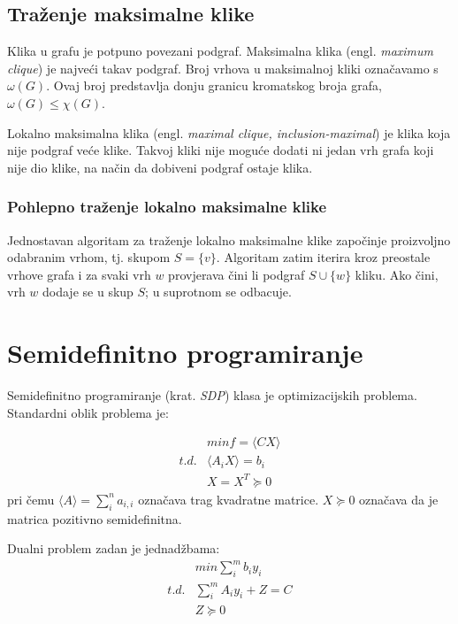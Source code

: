 \documentclass[diplomskirad]{fer}
\begin{document}
\section{Traženje maksimalne klike}
Klika u grafu je potpuno povezani podgraf. Maksimalna klika (engl. \textit{maximum clique}) je najveći takav podgraf. Broj vrhova u maksimalnoj kliki označavamo s $\omega(G)$.
Ovaj broj predstavlja donju granicu kromatskog broja grafa, $\omega(G) \leq \chi(G)$.

Lokalno maksimalna klika (engl. \textit{maximal clique, inclusion-maximal}) je klika koja nije podgraf veće klike. Takvoj kliki nije moguće dodati ni jedan
vrh grafa koji nije dio klike, na način da dobiveni podgraf ostaje klika.

\subsection{Pohlepno traženje lokalno maksimalne klike}
\label{pog:greedy_clique}
Jednostavan algoritam za traženje lokalno maksimalne klike započinje proizvoljno odabranim vrhom, tj. skupom $S = \{v\}$.
Algoritam zatim iterira kroz preostale vrhove grafa i za svaki vrh $w$ provjerava čini li podgraf $S \cup \{ w \}$ kliku. 
Ako čini, vrh $w$ dodaje se u skup $S$; u suprotnom se odbacuje.

\chapter{Semidefinitno programiranje}
\label{pog:semidefinitno_programiranje}
Semidefinitno programiranje (krat. \textit{SDP}) klasa je optimizacijskih problema.
Standardni oblik problema je:

\begin{equation}
\begin{split}
  & min f = \langle CX \rangle \\
  t. d. & \langle A_iX \rangle = b_i \\
        & X = X^T \succeq 0
\end{split}
\end{equation}
pri čemu $ \langle A \rangle = \sum_{i}^{n} a_{i,i} $
označava trag kvadratne matrice. $X \succeq 0$ označava da je matrica pozitivno semidefinitna.

Dualni problem zadan je jednadžbama: 
\begin{equation}
\begin{split}
  & min \sum_{i}^{m} b_iy_i \\
  t.d. & \sum_{i}^{m} A_iy_i + Z = C \\
      & Z \succeq 0 \\
\end{split}
\end{equation}
\end{document}
